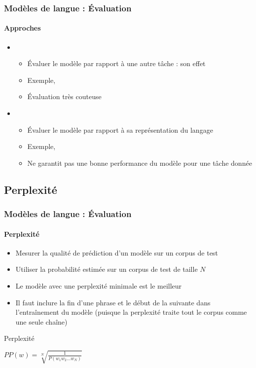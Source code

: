 \documentclass[xcolor=table]{beamer}
\begin{document}
\begin{frame}
\frametitle{Modèles de langue : Évaluation}
\framesubtitle{Approches}

\begin{itemize}
	\item {}
	\begin{itemize}
		\item Évaluer le modèle par rapport à une autre tâche : son effet
		\item Exemple,  
		\item Évaluation très couteuse
	\end{itemize}
	\item {}
	\begin{itemize}
		\item Évaluer le modèle par rapport à sa représentation du langage
		\item Exemple,  
		\item Ne garantit pas une bonne performance du modèle pour une tâche donnée
	\end{itemize}
\end{itemize}

\end{frame}

\subsection{Perplexité}

\begin{frame}
\frametitle{Modèles de langue : Évaluation}
\framesubtitle{Perplexité}

\begin{itemize}
	\item Mesurer la qualité de prédiction d'un modèle sur un corpus de test
	\item Utiliser la probabilité estimée sur un corpus de test de taille $N$
	\item Le modèle avec une perplexité minimale est le meilleur
	\item Il faut inclure la fin d'une phrase et le début de la suivante dans l'entraînement du modèle (puisque la perplexité traite tout le corpus comme une seule chaîne)
\end{itemize}

\begin{block}{Perplexité}
	\begin{center}
		$PP(w) = \sqrt[N]{\frac{1}{P(w_1 w_2 \ldots w_N)}}$
	\end{center}
\end{block}

\end{frame}

\end{document}
